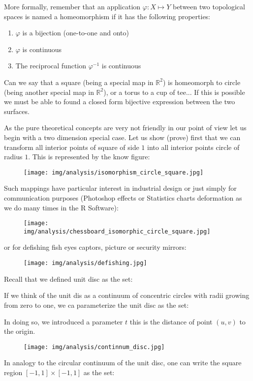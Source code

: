 	More formally, remember that an application $\varphi: X \mapsto Y$ between two topological spaces is named a homeomorphism if it has the following properties:
	\begin{enumerate}
		\item $\varphi$ is a bijection (one-to-one and onto)
		
		\item $\varphi$ is continuous
		
		\item The reciprocal function $\varphi^{-1}$ is continuous 
	\end{enumerate}
	
	Can we say that a square (being a special map in $\mathbb{R}^2$) is homeomorph to circle (being another special map in $\mathbb{R}^2$), or a torus to a cup of tee... If this is possible we must be able to found a closed form bijective expression between the two surfaces.
	
	As the pure theoretical concepts are very not friendly in our point of view let us begin with a two dimension special case. Let us show (prove) first that we can transform all interior points of  square of side $1$ into all interior points circle of radius $1$. This is represented by the  know figure:
	\begin{figure}[H]
		\centering
		\texttt{[image: img/analysis/isomorphism\_circle\_square.jpg]}
	\end{figure}
	Such mappings have particular interest in industrial design or just simply for communication purposes (Photoshop effects or Statistics charts deformation as we do many times in the R Software):
	\begin{figure}[H]
		\centering
		\texttt{[image: img/analysis/chessboard\_isomorphic\_circle\_square.jpg]}
	\end{figure}
	or for defishing fish eyes captors, picture or security mirrors:
	\begin{figure}[H]
		\centering
		\texttt{[image: img/analysis/defishing.jpg]}
	\end{figure}
	Recall that we defined unit disc as the set:
	
	If we think of the unit dis as a continuum of concentric circles with radii growing from zero to one, we ca parameterize the unit disc as the set:
	
	In doing so, we introduced a parameter $t$ this is the distance of point $(u,v)$ to the origin.
	\begin{figure}[H]
		\centering
		\texttt{[image: img/analysis/continnum\_disc.jpg]}
	\end{figure}
	In analogy to the circular continuum of the unit disc, one can write the square region $[-1,1] \times [-1,1]$ as the set:
	
